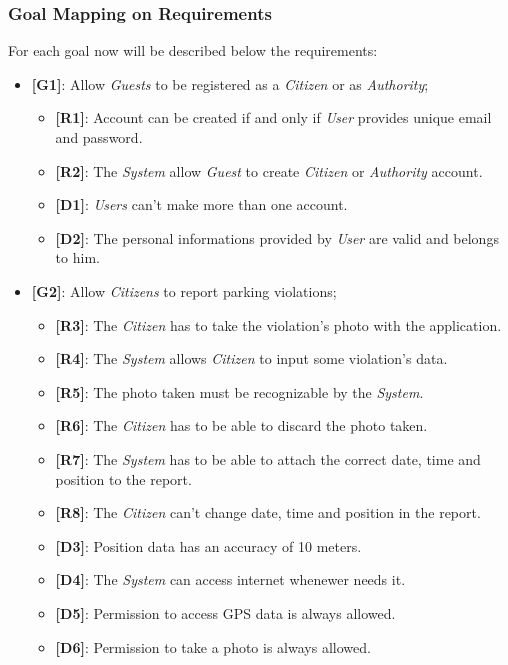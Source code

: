 \documentclass{article}
\begin{document}
\subsubsection{Goal Mapping on Requirements}
For each goal now will be described below the requirements:
\begin{itemize}
    \item \textbf{[G1]}: Allow \textit{Guests} to be registered as a \textit{Citizen} or as \textit{Authority};
    \begin{itemize}
        \item \textbf{[R1]}: Account can be created if and only if \textit{User} provides unique email and password.
        \item \textbf{[R2]}: The \textit{System} allow \textit{Guest} to create \textit{Citizen} or \textit{Authority} account.
        \item \textbf{[D1]}: \textit{Users} can't make more than one account.
        \item \textbf{[D2]}: The personal informations provided by \textit{User} are valid and belongs to him. 
    \end{itemize}

    \item \textbf{[G2]}: Allow \textit{Citizens} to report parking violations;
    \begin{itemize}
        \item \textbf{[R3]}: The \textit{Citizen} has to take the violation's photo with the application. 
        \item \textbf{[R4]}: The \textit{System} allows \textit{Citizen} to input some violation's data.
        \item \textbf{[R5]}: The photo taken must be recognizable by the \textit{System}.  
        \item \textbf{[R6]}: The \textit{Citizen} has to be able to discard the photo taken.
        \item \textbf{[R7]}: The \textit{System} has to be able to attach the correct date, time and position to the report.
        \item \textbf{[R8]}: The \textit{Citizen} can't change date, time and position in the report.
        \item \textbf{[D3]}: Position data has an accuracy of 10 meters.
        \item \textbf{[D4]}: The \textit{System} can access internet whenewer needs it.
        \item \textbf{[D5]}: Permission to access GPS data is always allowed.
        \item \textbf{[D6]}: Permission to take a photo is always allowed. 
    \end{itemize}


\end{itemize}
\end{document}
